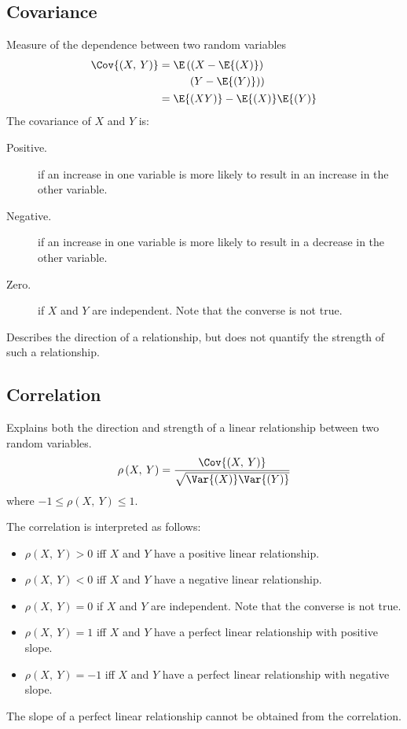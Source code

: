\documentclass{article}
\begin{document}
\begin{multicols}{3}
    \subsection{Covariance}
    Measure of the dependence between two random variables
    \begin{align*}
        \Cov{\left( X,\: Y \right)} & =
        \begin{aligned}[t]
            \E\left( \left( X - \E{\left( X \right)} \right) \right. & \\
            \left. \left( Y - \E{\left( Y \right)} \right) \right)   &
        \end{aligned}
        \\
                                    & = \E{\left( XY \right)} - \E{\left( X \right)} \E{\left( Y \right)}
    \end{align*}
    The covariance of \(X\) and \(Y\) is:
    \begin{description}
        \item[Positive.] if an increase in one variable is more likely
              to result in an increase in the other variable.
        \item[Negative.] if an increase in one variable is more likely
              to result in a decrease in the other variable.
        \item[Zero.] if \(X\) and \(Y\) are independent. Note that the
              converse is not true.
    \end{description}
    Describes the direction of a relationship, but does not quantify the strength of such a relationship.
    \subsection{Correlation}
    Explains both the direction and strength of a linear relationship
    between two random variables.
    \begin{equation*}
        \rho\left( X,\: Y \right) = \frac{\Cov{\left( X,\: Y \right)}}{\sqrt{\Var{\left( X \right)} \Var{\left( Y \right)}}}
    \end{equation*}
    where \(-1 \leq \rho\left( X,\: Y \right) \leq 1\).

    The correlation is interpreted as follows:
    \begin{itemize}
        \item \(\rho\left( X,\: Y \right) > 0\) iff \(X\) and \(Y\) have a positive linear relationship.
        \item \(\rho\left( X,\: Y \right) < 0\) iff \(X\) and \(Y\) have a negative linear relationship.
        \item \(\rho\left( X,\: Y \right) = 0\) if \(X\) and \(Y\) are independent. Note that the converse is not true.
        \item \(\rho\left( X,\: Y \right) = 1\) iff \(X\) and \(Y\) have a perfect linear relationship with positive slope.
        \item \(\rho\left( X,\: Y \right) = -1\) iff \(X\) and \(Y\) have a perfect linear relationship with negative slope.
    \end{itemize}
    The slope of a perfect linear relationship cannot be obtained from the correlation.
\end{multicols}
\end{document}
